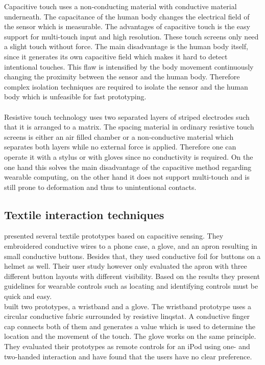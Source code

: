Capacitive touch uses a non-conducting material with conductive material underneath. The capacitance of the human body changes the electrical field of the sensor which is measurable. The advantages of capacitive touch is the easy support for multi-touch input and high resolution. These touch screens only need a slight touch without force. The main disadvantage is the human body itself, since  it generates its own capacitive field which makes it hard to detect intentional touches. This flaw is intensified by the body movement continuously changing the proximity between the sensor and the human body. Therefore complex isolation techniques are required to isolate the sensor and the human body which is unfeasible for fast prototyping. \\ \\
Resistive touch technology uses two separated layers of striped electrodes such that it is arranged to a matrix. The spacing material in ordinary resistive touch screens is either an air filled chamber or a non-conductive material which separates both layers while no external force is applied. Therefore one can operate it with a stylus or with gloves since no conductivity is required. On the one hand this solves the main disadvantage of the capacitive method regarding wearable computing, on the other hand it does not support multi-touch and is still prone to deformation and thus to unintentional contacts.

\subsection{Textile interaction techniques}
\cite{Holleis:2008:ECT:1409240.1409250} presented several textile prototypes based on capacitive sensing. They embroidered conductive wires to  a phone case, a glove, and an apron resulting in small conductive buttons. Besides that, they used conductive foil for buttons on a helmet as well. Their user study however only evaluated the apron with three different button layouts with different visibility. Based on the results they present guidelines for wearable controls such as locating and identifying controls must be quick and easy.
\\
\cite{Speir:2014:WRC:2628363.2634221} built two prototypes, a wristband and a glove. The wristband prototype uses a circular conductive fabric surrounded by resistive linqstat. A conductive finger cap connects both of them and generates a value which is used to determine the location and the movement of the touch. The glove works on the same principle. They evaluated their prototypes as remote controls for an iPod using one- and two-handed interaction and have found that the users have no clear preference. 

